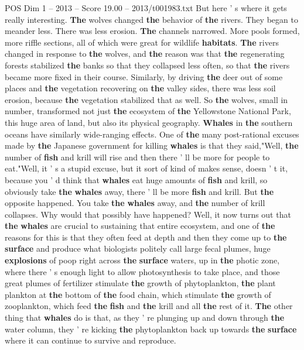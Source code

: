 \begin{textsample}{POS Dim 1 – 2013 – Score 19.00 – 2013/t001983.txt}
But here ' s where it gets really interesting. \textbf{The} wolves changed \textbf{the} behavior of \textbf{the} rivers.
They began to meander less.
There was less erosion. \textbf{The} channels narrowed.
More pools formed, more riffle sections, all of which were great for wildlife \textbf{habitats}. \textbf{The} rivers changed in response to \textbf{the} wolves, and \textbf{the} reason was that \textbf{the} regenerating forests stabilized \textbf{the} banks so that they collapsed less often, so that \textbf{the} rivers became more fixed in their course.
Similarly, by driving \textbf{the} deer out of some places and \textbf{the} vegetation recovering on \textbf{the} valley sides, there was less soil erosion, because \textbf{the} vegetation stabilized that as well.
So \textbf{the} wolves, small in number, transformed not just \textbf{the} ecosystem of \textbf{the} Yellowstone National Park, this huge area of land, but also its physical geography. \textbf{Whales} in \textbf{the} southern oceans have similarly wide-ranging effects.
One of \textbf{the} many post-rational excuses made by \textbf{the} Japanese government for killing \textbf{whales} is that they said,"Well, \textbf{the} number of \textbf{fish} and krill will rise and then there ' ll be more for people to eat."Well, it ' s a stupid excuse, but it sort of kind of makes sense, doesn ' t it, because you ' d think that \textbf{whales} eat huge amounts of \textbf{fish} and krill, so obviously take \textbf{the} \textbf{whales} away, there ' ll be more \textbf{fish} and krill.
But \textbf{the} opposite happened.
You take \textbf{the} \textbf{whales} away, and \textbf{the} number of krill collapses.
Why would that possibly have happened?
Well, it now turns out that \textbf{the} \textbf{whales} are crucial to sustaining that entire ecosystem, and one of \textbf{the} reasons for this is that they often feed at depth and then they come up to \textbf{the} \textbf{surface} and produce what biologists politely call large fecal plumes, huge \textbf{explosions} of poop right across \textbf{the} \textbf{surface} waters, up in \textbf{the} photic zone, where there ' s enough light to allow photosynthesis to take place, and those great plumes of fertilizer stimulate \textbf{the} growth of phytoplankton, \textbf{the} plant plankton at \textbf{the} bottom of \textbf{the} food chain, which stimulate \textbf{the} growth of zooplankton, which feed \textbf{the} \textbf{fish} and \textbf{the} krill and all \textbf{the} rest of it. \textbf{The} other thing that \textbf{whales} do is that, as they ' re plunging up and down through \textbf{the} water column, they ' re kicking \textbf{the} phytoplankton back up towards \textbf{the} \textbf{surface} where it can continue to survive and reproduce.

\end{textsample}
